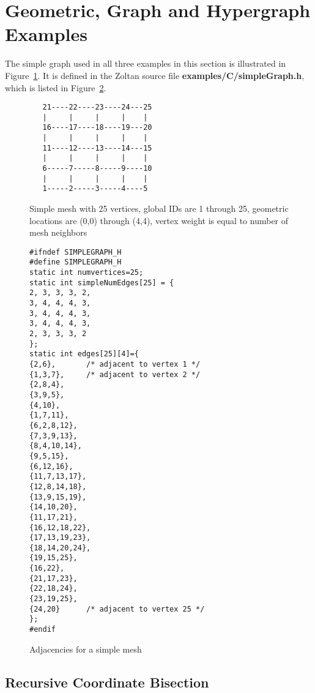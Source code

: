 \clearpage
\section{Geometric, Graph and Hypergraph Examples}

The simple graph used in all three examples in this section
is illustrated
in Figure~\ref{fig:mesh25}.
It is defined in the Zoltan source file \textbf{examples/C/simpleGraph.h},
which is listed in Figure~\ref{fig:simpleGraphDotH}.

\begin{figure}[bottom]
\label{fig:mesh25}
\begin{center}
\begin{verbatim}
   21----22----23----24---25
   |     |     |     |    |
   16----17----18----19---20
   |     |     |     |    |
   11----12----13----14---15
   |     |     |     |    |
   6-----7-----8-----9----10
   |     |     |     |    |
   1-----2-----3-----4----5
\end{verbatim}
\caption{Simple mesh with 25 vertices, global IDs are 1 through 25, geometric locations are (0,0) through (4,4), vertex weight is equal to number of mesh neighbors}
\end{center}
\end{figure}

\begin{figure}
\label{fig:simpleGraphDotH}
\begin{flushleft}
\begin{verbatim}
#ifndef SIMPLEGRAPH_H
#define SIMPLEGRAPH_H
static int numvertices=25;
static int simpleNumEdges[25] = {
2, 3, 3, 3, 2,
3, 4, 4, 4, 3,
3, 4, 4, 4, 3,
3, 4, 4, 4, 3,
2, 3, 3, 3, 2
};
static int edges[25][4]={
{2,6},       /* adjacent to vertex 1 */
{1,3,7},     /* adjacent to vertex 2 */
{2,8,4},
{3,9,5},
{4,10},
{1,7,11},
{6,2,8,12},
{7,3,9,13},
{8,4,10,14},
{9,5,15},
{6,12,16},
{11,7,13,17},
{12,8,14,18},
{13,9,15,19},
{14,10,20},
{11,17,21},
{16,12,18,22},
{17,13,19,23},
{18,14,20,24},
{19,15,25},
{16,22},
{21,17,23},
{22,18,24},
{23,19,25},
{24,20}      /* adjacent to vertex 25 */
};
#endif
\end{verbatim}
\end{flushleft}
\caption{Adjacencies for a simple mesh}
\end{figure}


\clearpage
\subsection{Recursive Coordinate Bisection}
\label{sec:rcb}

